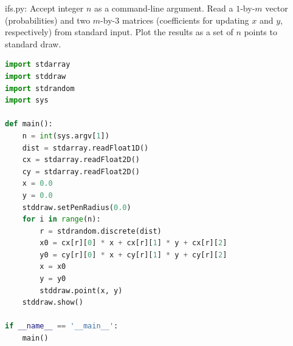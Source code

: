 \documentclass[8pt,a4paper,compress,handout]{beamer}
\begin{document}
\begin{frame}[fragile]
\begin{framed}
\tiny ifs.py: Accept integer $n$ as a command-line argument. Read a $1$-by-$m$ vector (probabilities) and two $m$-by-$3$ matrices (coefficients for updating $x$ and $y$, respectively) from standard input. Plot the results as a set of $n$ points to standard draw.
\end{framed}

\begin{lstlisting}[language=Python]
import stdarray
import stddraw
import stdrandom
import sys

def main():
    n = int(sys.argv[1])
    dist = stdarray.readFloat1D()
    cx = stdarray.readFloat2D()
    cy = stdarray.readFloat2D()
    x = 0.0
    y = 0.0
    stddraw.setPenRadius(0.0)
    for i in range(n):
        r = stdrandom.discrete(dist)
        x0 = cx[r][0] * x + cx[r][1] * y + cx[r][2]
        y0 = cy[r][0] * x + cy[r][1] * y + cy[r][2]
        x = x0
        y = y0
        stddraw.point(x, y)
    stddraw.show()

if __name__ == '__main__':
    main()
\end{lstlisting}
\end{frame}
\end{document}

